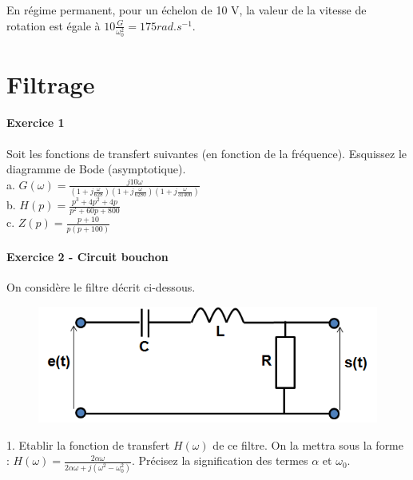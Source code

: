 \documentclass[11pt]{report}
\begin{document}
	En régime permanent, pour un échelon de 10 V, la valeur de la vitesse de rotation est égale à $10\frac{G}{\omega_{0}^2}=175 rad.s^{-1}$.\\
	
	
	
	
	
	
	\newpage
	
	\chapter{Filtrage}
	
	\subsubsection{Exercice 1}
	Soit les fonctions de transfert suivantes (en fonction de la fréquence). Esquissez le diagramme de Bode (asymptotique). \\
	
	a. $G(\omega)=\frac{j10\omega}{(1+j\frac{\omega}{628})(1+j\frac{\omega}{6280})(1+j\frac{\omega}{31400})}$\\
	
	b. $H(p)=\frac{p^3+4p^2+4p}{p^2+60p+800}$\\
	
	c. $Z(p)=\frac{p+10}{p(p+100)}$\\

	
	\subsubsection{Exercice 2 - Circuit bouchon}
	On considère le filtre décrit ci-dessous.
	
	\begin{figure}[h!]
		\centering
		\includegraphics[scale=0.5]{images/circuit_bouchon.png} 
	\end{figure}

	1. Etablir la fonction de transfert $H(\omega)$ de ce filtre. On la mettra sous la forme : $H(\omega)=\frac{2\alpha \omega}{2\alpha \omega+j(\omega^{2}-\omega_{0}^{2})}$. Précisez la signification des termes $\alpha$ et $\omega_{0}$.\\
	
\end{document}
